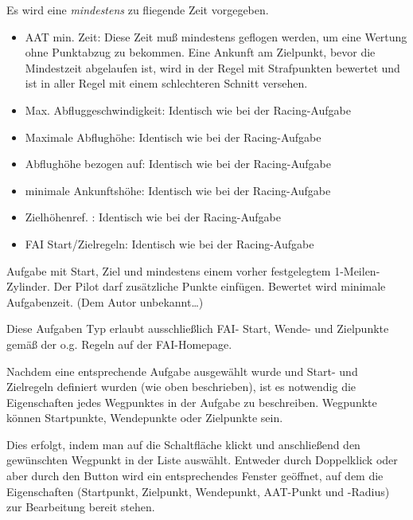 \begin{description}
 Es wird eine \textsl{mindestens} zu fliegende Zeit vorgegeben.
    \begin{itemize}
            \item AAT min. Zeit:  Diese Zeit muß mindestens geflogen werden, um eine Wertung ohne Punktabzug zu bekommen. Eine Ankunft am Zielpunkt, bevor die Mindestzeit abgelaufen ist, wird in der Regel mit Strafpunkten bewertet und ist in aller Regel mit einem schlechteren Schnitt versehen.
        	\item Max. Abfluggeschwindigkeit: Identisch wie bei der Racing-Aufgabe
        	\item Maximale Abflughöhe: Identisch wie bei der Racing-Aufgabe
        	\item Abflughöhe bezogen auf: Identisch wie bei der Racing-Aufgabe
        	\item minimale Ankunftshöhe: Identisch wie bei der Racing-Aufgabe
        	\item Zielhöhenref. : Identisch wie bei der Racing-Aufgabe
        	\item FAI Start/Zielregeln: Identisch wie bei der Racing-Aufgabe
    \end{itemize}
    \item[\p{Modified Area Task (MAT)}] Aufgabe mit Start, Ziel und mindestens einem vorher festgelegtem 1-Meilen-Zylinder. Der Pilot darf zusätzliche Punkte einfügen. Bewertet wird minimale Aufgabenzeit. (Dem Autor unbekannt\dots) 
\item[\p{FAI Abzeichen/Rekorde}] Diese Aufgaben Typ erlaubt ausschließlich FAI- Start, Wende- und Zielpunkte gemäß der o.g. Regeln auf der FAI-Homepage.
\end{description}

Nachdem eine entsprechende Aufgabe ausgewählt wurde und Start- und Zielregeln definiert wurden (wie oben beschrieben), ist es notwendig die Eigenschaften jedes Wegpunktes in der Aufgabe zu beschreiben. Wegpunkte können Startpunkte, Wendepunkte oder Zielpunkte sein.

Dies erfolgt, indem man auf die  Schaltfläche klickt und anschließend den gewünschten Wegpunkt in der Liste auswählt. Entweder durch Doppelklick oder aber durch den Button  wird ein entsprechendes Fenster geöffnet, auf dem die Eigenschaften (Startpunkt, Zielpunkt, Wendepunkt, AAT-Punkt und -Radius) zur Bearbeitung bereit stehen.

